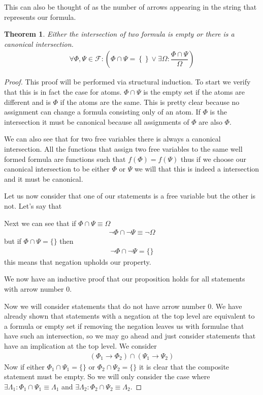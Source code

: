 \documentclass{article}
\newtheorem{thm}{Theorem}
\begin{document}
This can also be thought of as the number of arrows appearing in the string that represents our formula.

\begin{thm}
Either the intersection of two formula is empty or there is a canonical intersection.
\begin{align*}
\forall \Phi,\Psi \in \mathcal{F} : \left(\Phi \cap \Psi = \left\{\right\} \lor \exists \Omega : \dfrac{\Phi \cap \Psi}{\Omega} \right)
\end{align*}
\end{thm}
\begin{proof}
This proof will be performed via structural induction.
To start we verify that this is in fact the case for atoms.
$\Phi \cap \Psi$ is the empty set if the atoms are different and is $\Phi$ if the atoms are the same.
This is pretty clear because no assignment can change a formula consisting only of an atom.
If $\Phi$ is the intersection it must be canonical because all assignments of $\Phi$ are also $\Phi$.

We can also see that for two free variables there is always a canonical intersection.
All the functions that assign two free variables to the same well formed formula are functions such that $f(\Phi) = f(\Psi)$ thus if we choose
our canonical intersection to be either $\Phi$ or $\Psi$ we will that this is indeed a intersection and it must be canonical.

Let us now consider that one of our statements is a free variable but the other is not.
Let's say that 

Next we can see that if $\Phi \cap \Psi \equiv \Omega$
\begin{align*}
\neg \Phi \cap \neg \Psi \equiv \neg \Omega
\end{align*}
but if $\Phi \cap \Psi = \{\}$ then
\begin{align*}
\neg \Phi \cap \neg \Psi = \{\}
\end{align*}
this means that negation upholds our property.

We now have an inductive proof that our proposition holds for all statements with arrow number $0$.

Now we will consider statements that do not have arrow number $0$.
We have already shown that statements with a negation at the top level are equivalent to a formula or empty set if removing the negation leaves us with formulae that have such an intersection, so we may go ahead and just consider statements that have an implication at the top level.
We consider
\begin{align*}
(\Phi_1 \rightarrow \Phi_2) \cap (\Psi_1 \rightarrow \Psi_2)
\end{align*}
Now if either $\Phi_1 \cap \Psi_1 = \{\}$ or $\Phi_2 \cap \Psi_2 = \{\}$ it is clear that the composite statement must be empty.
So we will only consider the case where $\exists \Lambda_1 : \Phi_1 \cap \Psi_1 \equiv \Lambda_1$ and $\exists \Lambda_2 : \Phi_2 \cap \Psi_2 \equiv \Lambda_2$.


\end{proof}
\end{document}
